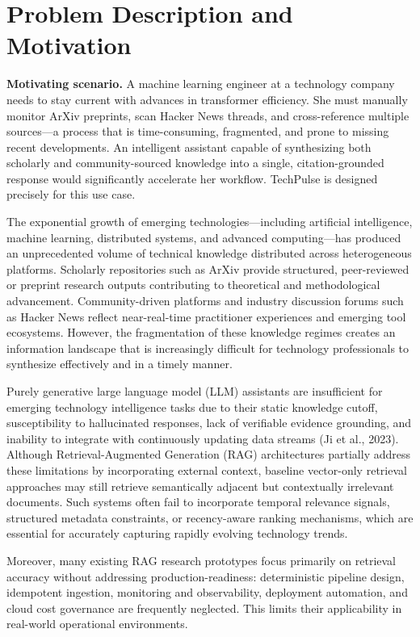 \documentclass[12pt,a4paper]{report}
\begin{document}
\section{Problem Description and Motivation}
\label{sec:problem}

\textbf{Motivating scenario.} A machine learning engineer at a technology company needs to stay current with advances in transformer efficiency. She must manually monitor ArXiv preprints, scan Hacker News threads, and cross-reference multiple sources---a process that is time-consuming, fragmented, and prone to missing recent developments. An intelligent assistant capable of synthesizing both scholarly and community-sourced knowledge into a single, citation-grounded response would significantly accelerate her workflow. TechPulse is designed precisely for this use case.

The exponential growth of emerging technologies---including artificial intelligence, machine learning, distributed systems, and advanced computing---has produced an unprecedented volume of technical knowledge distributed across heterogeneous platforms. Scholarly repositories such as ArXiv provide structured, peer-reviewed or preprint research outputs contributing to theoretical and methodological advancement. Community-driven platforms and industry discussion forums such as Hacker News reflect near-real-time practitioner experiences and emerging tool ecosystems. However, the fragmentation of these knowledge regimes creates an information landscape that is increasingly difficult for technology professionals to synthesize effectively and in a timely manner.

Purely generative large language model (LLM) assistants are insufficient for emerging technology intelligence tasks due to their static knowledge cutoff, susceptibility to hallucinated responses, lack of verifiable evidence grounding, and inability to integrate with continuously updating data streams (Ji et al., 2023). Although Retrieval-Augmented Generation (RAG) architectures partially address these limitations by incorporating external context, baseline vector-only retrieval approaches may still retrieve semantically adjacent but contextually irrelevant documents. Such systems often fail to incorporate temporal relevance signals, structured metadata constraints, or recency-aware ranking mechanisms, which are essential for accurately capturing rapidly evolving technology trends.

Moreover, many existing RAG research prototypes focus primarily on retrieval accuracy without addressing production-readiness: deterministic pipeline design, idempotent ingestion, monitoring and observability, deployment automation, and cloud cost governance are frequently neglected. This limits their applicability in real-world operational environments.
\end{document}
